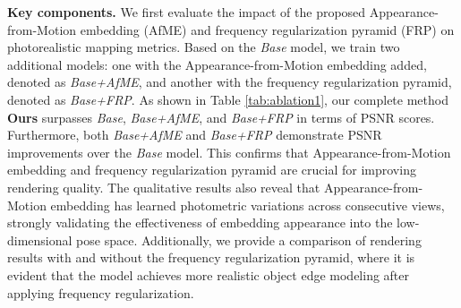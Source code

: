 \noindent\textbf{Key components.}
We first evaluate the impact of the proposed Appearance-from-Motion embedding (AfME) and frequency regularization pyramid (FRP) on photorealistic mapping metrics. Based on the \textit{Base} model, we train two additional models: one with the Appearance-from-Motion embedding added, denoted as \textit{Base+AfME}, and another with the frequency regularization pyramid, denoted as \textit{Base+FRP}. As shown in Table \ref{tab:ablation1}, our complete method \textbf{Ours} surpasses \textit{Base}, \textit{Base+AfME}, and \textit{Base+FRP} in terms of PSNR scores. Furthermore, both \textit{Base+AfME} and \textit{Base+FRP} demonstrate PSNR improvements over the \textit{Base} model. This confirms that Appearance-from-Motion embedding and frequency regularization pyramid are crucial for improving rendering quality. The qualitative results also reveal that Appearance-from-Motion embedding has learned photometric variations across consecutive views, strongly validating the effectiveness of embedding appearance into the low-dimensional pose space. Additionally, we provide a comparison of rendering results with and without the frequency regularization pyramid, where it is evident that the model achieves more realistic object edge modeling after applying frequency regularization.

